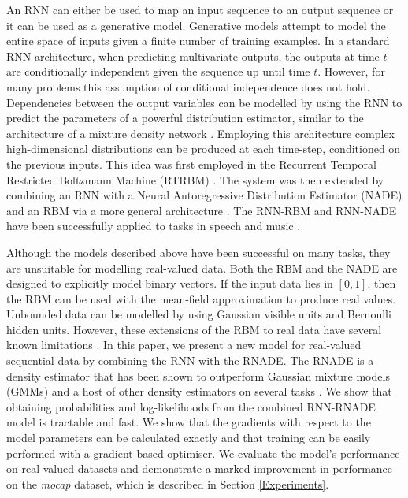 \documentclass{article} %
\begin{document}
An RNN can either be used to map an input sequence to an output sequence or it can be used as a generative model. Generative models attempt to model the entire space of inputs given a finite number of training examples. In a standard RNN architecture, when predicting multivariate outputs, the outputs at time $t$ are conditionally independent given the sequence up until time $t$. However, for many problems this assumption of conditional independence does not hold. Dependencies between the output variables can be modelled by using the RNN to predict the parameters of a powerful distribution estimator, similar to the architecture of a mixture density network \cite{bishop1994mixture}. Employing this architecture complex high-dimensional distributions can be produced at each time-step, conditioned on the previous inputs. This idea was first employed in the Recurrent Temporal Restricted Boltzmann Machine (RTRBM) \cite{Sutskever2008}. The system was then extended by combining an RNN with a Neural Autoregressive Distribution Estimator (NADE) and an RBM via a more general architecture \cite{Boulanger-Lewandowski2012}. The RNN-RBM and RNN-NADE have been successfully applied to tasks in speech and music \cite{boulangerphone,Boulanger-Lewandowski2012}. 

Although the models described above have been successful on many tasks, they are unsuitable for modelling real-valued data. Both the RBM and the NADE are designed to explicitly model binary vectors. If the input data lies in $[0,1]$, then the RBM can be used with the mean-field approximation to produce real values. Unbounded data can be modelled by using Gaussian visible units and Bernoulli hidden units. However, these extensions of the RBM to real data have several known limitations \cite{theis2011all}. In this paper, we present a new model for real-valued sequential data by combining the RNN with the RNADE. The RNADE is a density estimator that has been shown to outperform Gaussian mixture models (GMMs) and a host of other density estimators on several tasks \cite{Uria2013}. We show that obtaining probabilities and log-likelihoods from the combined RNN-RNADE model is tractable and fast. We show that the gradients with respect to the model parameters can be calculated exactly and that training can be easily performed with a gradient based optimiser. We evaluate the model's performance on real-valued datasets and demonstrate a marked improvement in performance on the {\it \textit{mocap}} dataset, which is described in Section \ref{Experiments}. 
 
\end{document}
